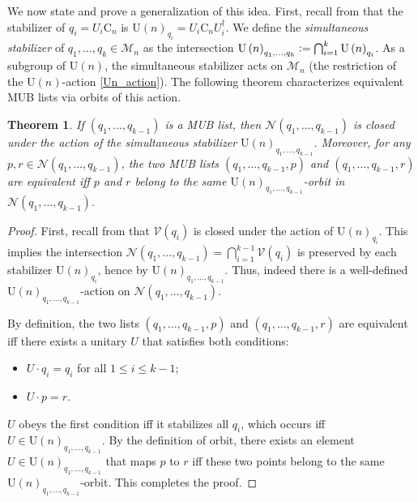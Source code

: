 \documentclass[referee,sn-mathphys-num]{sn-jnl}%
\theoremstyle{thmstyleone}%
\newtheorem{theorem}{Theorem}%
\theoremstyle{thmstyletwo}%
\theoremstyle{remark}
\theoremstyle{thmstylethree}%
\newcommand{\defeq}{\vcentcolon=}
\begin{document}
We now state and prove a generalization of this idea. First, recall from  that the stabilizer of $q_i = U_i \mathrm{C}_n$ is $\mathrm{U} \left( n \right)_{q_i} = U_i \mathrm{C}_n U_i^\dagger$.
We define the \textit{simultaneous stabilizer} of $ q_1, \ldots, q_k \in \mathcal{M}_n $ as the intersection $ \mathrm{U} \left( n \right)_{q_1, \ldots, q_k} \defeq \bigcap_{i=1}^k \mathrm{U} \left( n \right)_{q_i} $. As a subgroup of $ \mathrm{U} \left( n \right) $, the simultaneous stabilizer acts on  $ \mathcal{M}_n $ (the restriction of the $ \mathrm{U} \left( n \right) $-action \eqref{Un_action}). The following theorem characterizes equivalent MUB lists via orbits of this action.
\begin{theorem}\label{thm:main}
	If $ \left( q_1, \ldots, q_{k-1} \right) $ is a MUB list, then $ \mathcal{N} \left( q_1, \ldots, q_{k-1} \right) $ is closed under the action of the simultaneous stabilizer  $ \mathrm{U} \left( n \right)_{q_1, \ldots, q_{k-1} } $.
	Moreover, for any $p,r \in \mathcal{N} \left( q_1, \ldots, q_{k-1} \right) $, the two MUB lists $ \left( q_1, \ldots, q_{k-1}, p \right) $ and $ \left( q_1, \ldots, q_{k-1}, r \right) $ are equivalent iff $p$ and $r$ belong to the same $\mathrm{U} \left( n \right)_{q_1, \ldots, q_{k-1} }$-orbit in $ \mathcal{N} \left( q_1, \ldots, q_{k-1} \right) $.
\end{theorem}
\begin{proof}
	First, recall from  that $ \mathcal{V} \left( q_i \right) $ is closed under the action of $ \mathrm{U} \left( n \right)_{q_i} $. This implies the intersection $\mathcal{N} \left( q_1, \ldots, q_{k-1} \right) = \bigcap_{i=1}^{k-1} \mathcal{V} \left( q_i \right) $ is preserved by each stabilizer $ \mathrm{U} \left( n \right)_{q_i} $, hence by $\mathrm{U} \left( n \right)_{q_1, \ldots, q_{k-1} }$. Thus, indeed there is a well-defined $\mathrm{U} \left( n \right)_{q_1, \ldots, q_{k-1} }$-action on $ \mathcal{N} \left( q_1, \ldots, q_{k-1} \right) $.

	By definition, the two lists $ \left( q_1, \ldots, q_{k-1}, p \right) $ and $ \left( q_1, \ldots, q_{k-1}, r \right) $ are equivalent iff there exists a unitary $U$ that satisfies both conditions: 
	\begin{itemize}
		\item $ U \cdot q_i = q_i $ for all $1 \leq i \leq k-1$;
		\item $U \cdot p = r$.
	\end{itemize}
	$U$ obeys the first condition iff it stabilizes all $q_i$, which occurs iff $ U \in \mathrm{U} \left( n \right)_{q_1, \ldots, q_{k-1} } $.
	By the definition of orbit, there exists an element $U \in \mathrm{U} \left( n \right)_{q_1, \ldots, q_{k-1} }$ that maps $p$ to $r$ iff these two points belong to the same $\mathrm{U} \left( n \right)_{q_1, \ldots, q_{k-1} }$-orbit. This completes the proof.
\end{proof}
\end{document}
